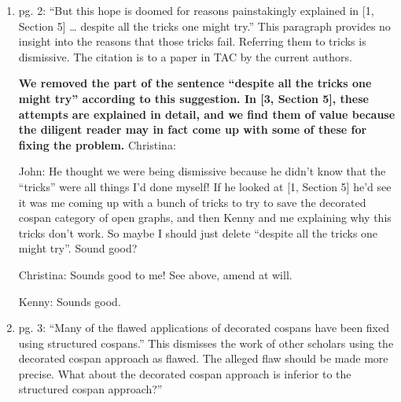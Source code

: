 \documentclass[reqno]{amsart}
\def\chris{\color{purple} Christina: }
\def\john{\color{red} John: }
\def\kenny{\color{blue} Kenny: }
\begin{document}
\begin{enumerate}
{\bf We have added a reference to the new paper ``An
algebraic framework for structured epidemic modeling'' by A.\ Baas, J.\ Fairbanks, M.\ Halter, S.\ Libkind and E.\ Patterson.  We have also added a reference to the AlgebraicPetri GitHub repository.}

{\john \checkmark} {\kenny \checkmark} {\chris \checkmark}

\iffalse
{\john It'd be good to add a reference to the repository.}

{\chris I added the reference but looks a bit funny, edit at will. Did not add any text.}

{\john I've improved the reference and added a citation to it.  Is this okay now?}

{\chris Yes!}
\fi


\item pg. 2: “But this hope is doomed for reasons painstakingly explained in [1, Section 5] … despite all the tricks one might try.” This paragraph 
provides 
no insight into the reasons that those tricks fail. Referring them to tricks is dismissive. The citation is to a paper in TAC by the current authors.

{\bf We removed the part of the sentence ``despite all the tricks one might try'' according to this suggestion. In [3, Section 5], these attempts are 
explained in detail, and we find them of value because the diligent reader may in fact come up with some of these for fixing the problem.} {\chris 
\checkmark}

{\john He thought we were being dismissive because he didn't know that the ``tricks'' were all things I'd done myself!  If he looked at [1, Section 5] 
he'd see it was me coming up with a bunch of tricks to try to save the decorated cospan category of open graphs, and then Kenny and me explaining why 
this tricks don't work.  So maybe I should just delete ``despite all the tricks one might try''.  Sound good?}

{\chris Sounds good to me! See above, amend at will.}

{\kenny Sounds good.}

\item pg. 3: ``Many of the flawed applications of decorated cospans have been fixed using structured cospans.” This dismisses the work of other 
scholars 
using the decorated cospan approach as flawed. The alleged flaw should be made more precise. What about the decorated cospan approach is inferior to 
the structured cospan approach?''


\end{enumerate}
\end{document}
